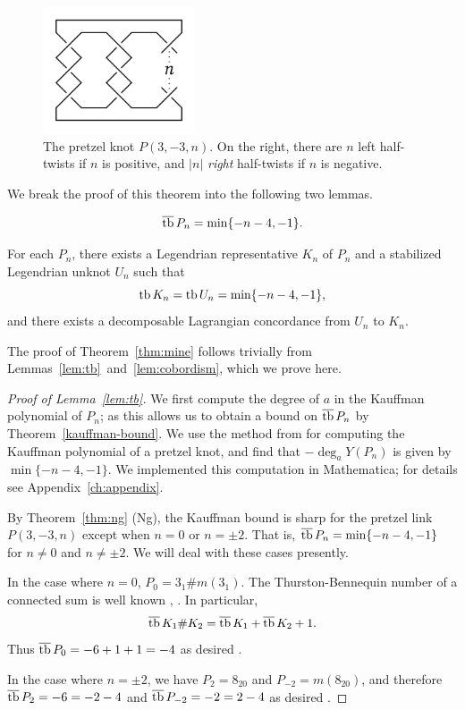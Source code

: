\begin{figure}[ht!]
    \centering
    \includegraphics[width=0.4\textwidth]{images/pretzel-knot.pdf}
    \caption{The pretzel knot $P(3, -3, n)$. On the right, there are $n$ left half-twists if $n$ is positive, and $|n|$ \emph{right} half-twists if $n$ is negative.}
    \label{fig:pretzel-knot}
\end{figure}

We break the proof of this theorem into the following two lemmas.
\begin{lemma}\label{lem:tb}
    \[
        \overline{\operatorname{tb}}\, P_n = \min \{ -n-4, -1\}.
    \]
\end{lemma}

\begin{lemma}\label{lem:cobordism}
    For each $P_n$, there exists a Legendrian representative $K_n$ of $P_n$ and a stabilized Legendrian unknot $U_n$ such that 
    \[
        \operatorname{tb} K_n = \operatorname{tb} U_n = \min \{-n-4, -1\},
    \]
    and there exists a decomposable Lagrangian concordance from $U_n$ to $K_n$.
\end{lemma}

The proof of Theorem~\ref{thm:mine} follows trivially from Lemmas~\ref{lem:tb}~and~\ref{lem:cobordism}, which we prove here.

\begin{proof}[Proof of Lemma~\ref{lem:tb}]

    We first compute the degree of $a$ in the Kauffman polynomial of $P_n$; as this allows us to obtain a bound on $\overline{\operatorname{tb}}\, P_n$ by Theorem~\ref{kauffman-bound}. We use the method from \cite{lu-zhong} for computing the Kauffman polynomial of a pretzel knot, and find that $- \deg_a Y(P_n)$ is given by $\min\{-n-4, -1\}$. We implemented this computation in Mathematica; for details see Appendix~\ref{ch:appendix}.
    
    By Theorem~\ref{thm:ng} (Ng), the Kauffman bound is sharp for the pretzel link $P(3, -3, n)$ except when $n = 0$ or $n = \pm 2$. That is, ${\overline{\operatorname{tb}}\, P_n = \min\{-n-4, -1\}}$ for $n \neq 0$ and $n \neq \pm 2$. We will deal with these cases presently.

    In the case where $n = 0$, ${P_0 = 3_1 \# m(3_1)}$. The Thurston-Bennequin number of a connected sum is well known \cite{torisu}, \cite{honda}. In particular,
    \[
        \overline{\operatorname{tb}}\,{K_1 \# K_2} = \overline{\operatorname{tb}}\, K_1 + \overline{\operatorname{tb}}\, K_2 + 1.
    \]
    Thus $\overline{\operatorname{tb}}\, P_0 = -6 + 1 + 1 = -4$ as desired \cite{atlas}.

    In the case where $n = \pm 2$, we have $P_2 = 8_{20}$ and $P_{-2} = m(8_{20})$, and therefore ${\overline{\operatorname{tb}}\, P_2 = -6 = -2-4}$ and ${\overline{\operatorname{tb}}\, P_{-2} = -2 = 2-4}$ as desired \cite{atlas}.

\end{proof}


